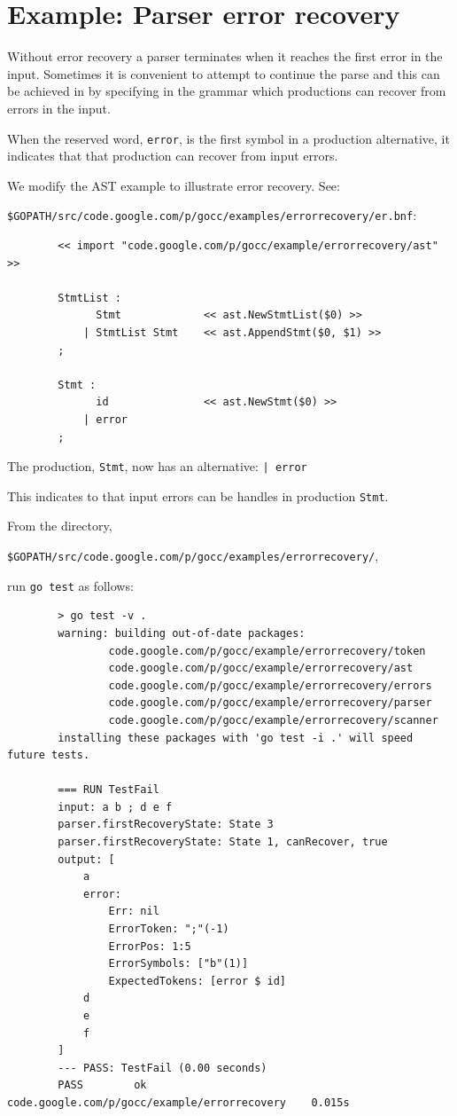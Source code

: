 \documentclass[12pt]{article}
\begin{document}
\section{Example: Parser error recovery} \label{sec:error recovery}
	Without error recovery a \gocc parser terminates when it reaches the first error in the input. Sometimes it is convenient to attempt to continue the parse and this can be achieved in \gocc by specifying in the grammar which productions can recover from errors in the input. 

	When the \gocc reserved word, \verb|error|, is the first symbol in a production alternative, it indicates that that production can recover from input errors.

	We modify the AST example to illustrate error recovery. See:

	\verb|$GOPATH/src/code.google.com/p/gocc/examples/errorrecovery/er.bnf|:

	\begin{verbatim}
		<< import "code.google.com/p/gocc/example/errorrecovery/ast" >>

		StmtList : 
		      Stmt             << ast.NewStmtList($0) >>
		    | StmtList Stmt    << ast.AppendStmt($0, $1) >>
		;

		Stmt : 
		      id               << ast.NewStmt($0) >>
		    | error
		;
	\end{verbatim}

	The production, \verb|Stmt|, now has an alternative: \verb"| error"

	This indicates to \gocc that input errors can be handles in production \verb|Stmt|.

	From the directory, 

	\verb|$GOPATH/src/code.google.com/p/gocc/examples/errorrecovery/|, 

	run \verb|go test| as follows:

	\begin{verbatim}
		> go test -v .
		warning: building out-of-date packages:
		        code.google.com/p/gocc/example/errorrecovery/token
		        code.google.com/p/gocc/example/errorrecovery/ast
		        code.google.com/p/gocc/example/errorrecovery/errors
		        code.google.com/p/gocc/example/errorrecovery/parser
		        code.google.com/p/gocc/example/errorrecovery/scanner
		installing these packages with 'go test -i .' will speed future tests.

		=== RUN TestFail
		input: a b ; d e f
		parser.firstRecoveryState: State 3
		parser.firstRecoveryState: State 1, canRecover, true
		output: [
		    a
		    error:
		        Err: nil
		        ErrorToken: ";"(-1)
		        ErrorPos: 1:5
		        ErrorSymbols: ["b"(1)]
		        ExpectedTokens: [error $ id]
		    d
		    e
		    f
		]
		--- PASS: TestFail (0.00 seconds)
		PASS		ok      code.google.com/p/gocc/example/errorrecovery	0.015s
	\end{verbatim}
\end{document}
